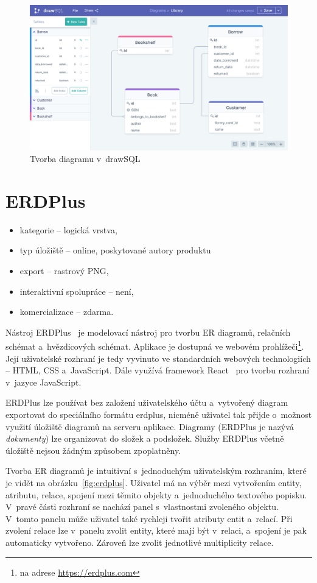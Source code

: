 \begin{figure}
  \centering
  \includegraphics[width = \textwidth]{../img/drawsql.png}
  \caption{Tvorba diagramu v~drawSQL}
  \label{fig:drawsql}
\end{figure}

\section{ERDPlus}
\begin{itemize}
  \item kategorie -- logická vrstva,
  \item typ úložiště -- online, poskytované autory produktu
  \item export -- rastrový PNG,
  \item interaktivní spolupráce -- není,
  \item komercializace -- zdarma.
\end{itemize}

Nástroj ERDPlus~\cite{erdplus21} je modelovací nástroj pro tvorbu ER diagramů, relačních schémat a~hvězdicových schémat.
Aplikace je dostupná ve webovém prohlížeči\footnote{na adrese \url{https://erdplus.com}}.
Její uživatelské rozhraní je tedy vyvinuto ve standardních webových technologiích -- HTML, CSS a~JavaScript.
Dále využívá framework React~\cite{react2021} pro tvorbu rozhraní v~jazyce JavaScript.

ERDPlus lze používat bez založení uživatelského účtu a~vytvořený diagram exportovat do speciálního formátu erdplus, nicméně uživatel tak přijde o~možnost využití úložiště diagramů na serveru aplikace.
Diagramy (ERDPlus je nazývá \emph{dokumenty}) lze organizovat do složek a podsložek.
Služby ERDPlus včetně úložiště nejsou žádným způsobem zpoplatněny.

Tvorba ER diagramů je intuitivní s~jednoduchým uživatelským rozhraním, které je vidět na obrázku~\ref{fig:erdplus}.
Uživatel má na výběr mezi vytvořením entity, atributu, relace, spojení mezi těmito objekty a~jednoduchého textového popisku.
V~pravé části rozhraní se nachází panel s~vlastnostmi zvoleného objektu.
V~tomto panelu může uživatel také rychleji tvořit atributy entit a~relací.
Při zvolení relace lze v~panelu zvolit entity, které mají být v~relaci, a~spojení je pak automaticky vytvořeno.
Zároveň lze zvolit jednotlivé multiplicity relace.

